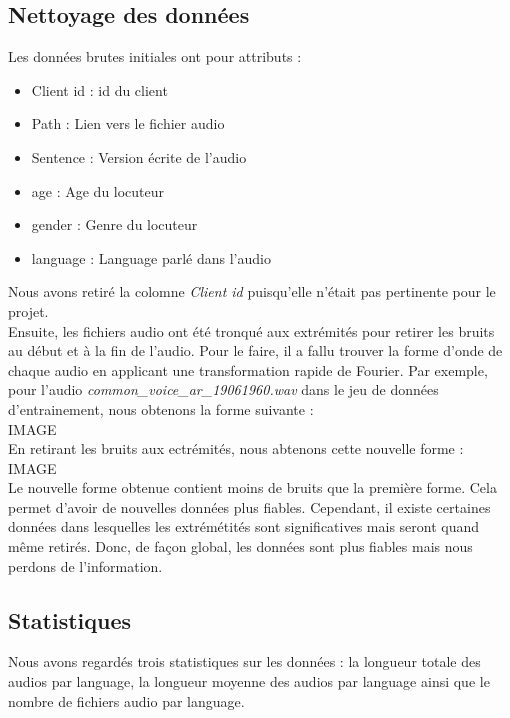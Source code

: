 \documentclass[11pt]{article}
\begin{document}
\subsection{Nettoyage des données}
Les données brutes initiales ont pour attributs :\\
\begin{itemize}
    \item Client id : id du client
    \item Path : Lien vers le fichier audio
    \item Sentence : Version écrite de l'audio
    \item age : Age du locuteur
    \item gender : Genre du locuteur
    \item language : Language parlé dans l'audio
\end{itemize}
Nous avons retiré la colomne \textit{Client id} puisqu'elle n'était pas pertinente pour le projet.\\
Ensuite, les fichiers audio ont été tronqué aux extrémités pour retirer les bruits au début et à la fin de l'audio. Pour le faire, il a fallu trouver la forme d'onde de chaque audio en applicant une transformation rapide de Fourier. Par exemple, pour l'audio \textit{common\_voice\_ar\_19061960.wav} dans le jeu de données d'entrainement, nous obtenons la forme suivante :\\

IMAGE\\

En retirant les bruits aux ectrémités, nous abtenons cette nouvelle forme :\\

IMAGE\\

Le nouvelle forme obtenue contient moins de bruits que la première forme. Cela permet d'avoir de nouvelles données plus fiables. Cependant, il existe certaines données dans lesquelles les extrémétités sont significatives mais seront quand même retirés. Donc, de façon global, les données sont plus fiables mais nous perdons de l'information.

\subsection{Statistiques}
Nous avons regardés trois statistiques sur les données : la longueur totale des audios par language, la longueur moyenne des audios par language ainsi que le nombre de fichiers audio par language.\\
\end{document}
